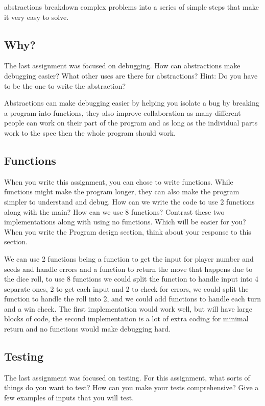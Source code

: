 \documentclass{article}
\begin{document}
abstractions breakdown complex problems into a series of simple steps that make it very easy to solve.

\subsection{Why?}

The last assignment was focused on debugging. How can abstractions make debugging easier?
What other uses are there for abstractions? Hint: Do you have to be the one to write the abstraction?

Abstractions can make debugging easier by helping you isolate a bug by breaking a program into functions, they also improve collaboration as many different people can work on their part of the program and as long as the individual parts work to the spec then the whole program should work.

\subsection{Functions}

When you write this assignment, you can chose to write functions. While functions might make the program longer, they can also make the program simpler to understand and debug. 
How can we write the code to use 2 functions along with the main? How can we use 8 functions? Contrast these two implementations along with using no functions. Which will be easier for you?
When you write the Program design section, think about your response to this section. 

We can use 2 functions being a function to get the input for player number and seeds and handle errors and a function to return the move that happens due to the dice roll, to use 8 functions we could split the function to handle input into 4 separate ones, 2 to get each input and 2 to check for errors, we could split the function to handle the roll into 2, and we could add functions to handle each turn and a win check. The first implementation would work well, but will have large blocks of code, the second implementation is a lot of extra coding for minimal return and no functions would make debugging hard.

\subsection{Testing}

The last assignment was focused on testing. For this assignment, what sorts of things do you want to test? How can you make your tests comprehensive?
Give a few examples of inputs that you will test.
\end{document}

